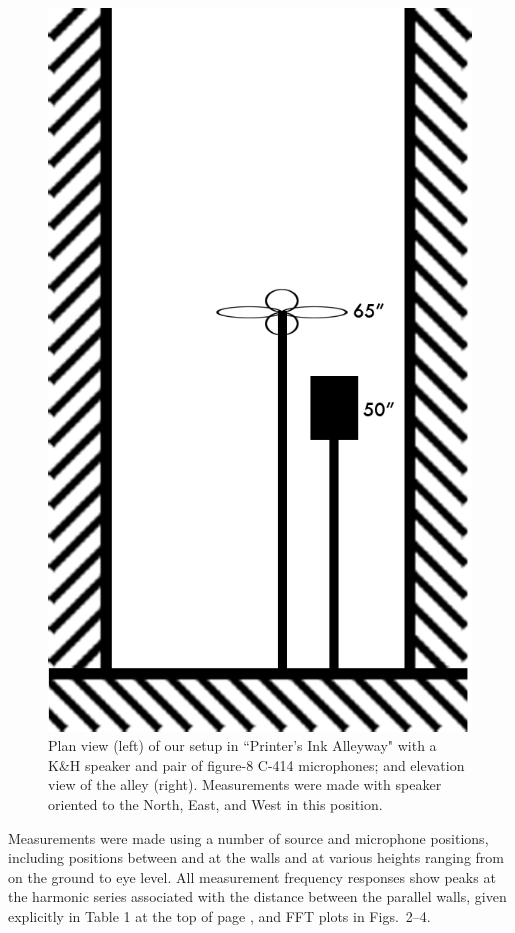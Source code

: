 \documentclass{aes137}
\begin{document}
\begin{figure}
\begin{minipage}[b]{0.41\linewidth}
\includegraphics[width=\textwidth]{images/alleyway_lookingdown.png}
\end{minipage}

\caption{Plan view (left) of our setup in ``Printer's Ink Alleyway"
  with a K\&H speaker and pair of figure-8 C-414 microphones; and
  elevation view of the alley (right). Measurements were made with
  speaker oriented to the North, East, and West in this position.}
\end{figure}

Measurements were made using a number of source and microphone
positions, including positions between and at the walls and at various
heights ranging from on the ground to eye level. All measurement
frequency responses show peaks at the harmonic series associated with
the distance between the parallel walls, given explicitly in Table 1
at the top of page \pageref{table:geometries}, and FFT plots in
Figs.~2--4.
\end{document}
